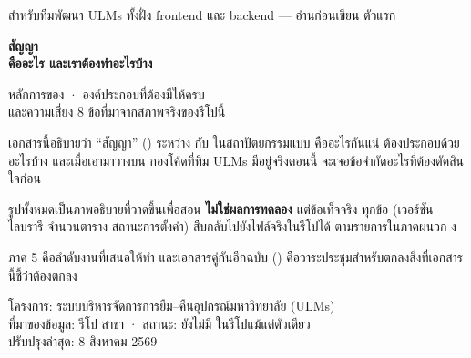 \begin{titlepage}
\thispagestyle{empty}

\vspace*{1.4cm}
{\sansall\color{muted}\small สำหรับทีมพัฒนา ULMs ทั้งฝั่ง frontend และ backend --- อ่านก่อนเขียน  ตัวแรก}

\vspace{0.9cm}
{\sansall\bfseries\fontsize{27}{33}\selectfont\color{ctr!90!black}
สัญญา \\คืออะไร และเราต้องทำอะไรบ้าง\par}

\vspace{0.5cm}
{\sansall\fontsize{13.5}{19}\selectfont\color{ink}
หลักการของ  · องค์ประกอบที่ต้องมีให้ครบ\\
และความเสี่ยง 8 ข้อที่มาจากสภาพจริงของรีโปนี้\par}

\vspace{3.0cm}

\begin{minipage}{0.66\textwidth}
เอกสารนี้อธิบายว่า ``สัญญา'' () ระหว่าง  กับ 
ในสถาปัตยกรรมแบบ  คืออะไรกันแน่ ต้องประกอบด้วยอะไรบ้าง และเมื่อเอามาวางบน
กองโค้ดที่ทีม ULMs มีอยู่จริงตอนนี้ จะเจอข้อจำกัดอะไรที่ต้องตัดสินใจก่อน

\vspace{0.6em}
รูปทั้งหมดเป็นภาพอธิบายที่วาดขึ้นเพื่อสอน \textbf{ไม่ใช่ผลการทดลอง} แต่ข้อเท็จจริง
ทุกข้อ (เวอร์ชันไลบรารี จำนวนตาราง สถานะการตั้งค่า) สืบกลับไปยังไฟล์จริงในรีโปได้
ตามรายการในภาคผนวก ง

\vspace{0.6em}
ภาค 5 คือลำดับงานที่เสนอให้ทำ และเอกสารคู่กันอีกฉบับ
() คือวาระประชุมสำหรับตกลงสิ่งที่เอกสารนี้ชี้ว่าต้องตกลง
\end{minipage}

\vfill
{}
\vspace{0.3em}

{\sansall\footnotesize\color{muted}
โครงการ: ระบบบริหารจัดการการยืม--คืนอุปกรณ์มหาวิทยาลัย (ULMs) \\
ที่มาของข้อมูล: รีโป  สาขา  · สถานะ: ยังไม่มี   ในรีโปแม้แต่ตัวเดียว \\
ปรับปรุงล่าสุด: 8 สิงหาคม 2569}
\end{titlepage}

